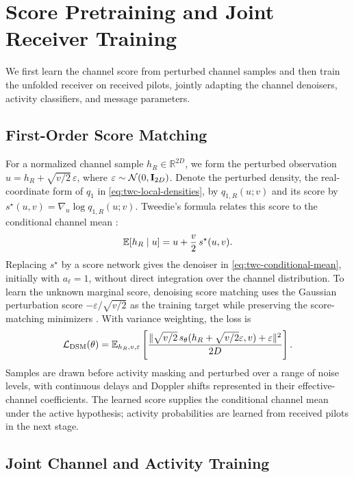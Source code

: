 \section{Score Pretraining and Joint Receiver Training}
\label{sec:learning}

We first learn the channel score from perturbed channel samples and
then train the unfolded receiver on received pilots, jointly adapting
the channel denoisers, activity classifiers, and message parameters.

\subsection{First-Order Score Matching}

For a normalized channel sample $h_R\in\mathbb R^{2D}$, we form
the perturbed observation $u=h_R+\sqrt{v/2}\,\varepsilon$, where
$\varepsilon\sim\mathcal N(0,\mathbf{I}_{2D})$. Denote the perturbed
density, the real-coordinate form of $q_1$ in
\eqref{eq:twc-local-densities}, by $q_{1,R}(u;v)$ and its score by
$s^\star(u,v)=\nabla_u\log q_{1,R}(u;v)$.
Tweedie's formula relates this score to the conditional channel mean
\cite{efron2011,cai2026}:
\begin{equation}
\mathbb{E}[h_R\mid u]=u+\frac v2\,s^\star(u,v).
 \label{eq:twc-tweedie}
\end{equation}
Replacing $s^\star$ by a score network gives the denoiser in
\eqref{eq:twc-conditional-mean}, initially with $a_\ell=1$, without
direct integration over the channel distribution. To learn the
unknown marginal score, denoising score matching uses the Gaussian
perturbation score $-\varepsilon/\sqrt{v/2}$ as the training target
while preserving the score-matching minimizers
\cite{vincent2011,song2019}. With variance weighting, the loss is
\begin{equation}
 \mathcal L_{\rm DSM}(\theta)=\mathbb{E}_{h_R,v,\varepsilon}
 \left[\frac{\|\sqrt{v/2}\,s_\theta(h_R+\sqrt{v/2}\varepsilon,v)
                      +\varepsilon\|^2}{2D}\right].
 \label{eq:twc-dsm}
\end{equation}
Samples are drawn before activity masking and perturbed over a range
of noise levels, with continuous delays and Doppler shifts represented
in their effective-channel coefficients. The learned score supplies
the conditional channel mean under the active hypothesis; activity
probabilities are learned from received pilots in the next stage.

\subsection{Joint Channel and Activity Training}
\label{sec:twc-joint-training}

